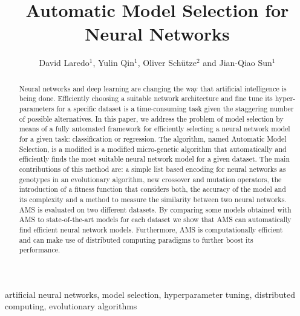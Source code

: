 
\begin{frontmatter}

\title{Automatic Model Selection for Neural Networks}

\author{David Laredo$^{1}$, Yulin Qin$^{1}$, Oliver Sch\"utze$^{2}$ and Jian-Qiao Sun$^{1}$}
\address{
$^{1}$Department of Mechanical Engineering, School of Engineering\\
University of California, Merced, CA 95343, USA\\
$^{2}$Department of Computer Science, CINVESTAV, Mexico City, Mexico\\
Corresponding author: Jian-Qiao Sun. Email: jqsun@ucmerced.edu}

\begin{abstract}
Neural networks and deep learning are changing the way that artificial intelligence is being done. Efficiently choosing a suitable network architecture and fine tune its hyper-parameters for a specific dataset is a time-consuming task given the staggering number of possible alternatives. In this paper, we address the problem of model selection by means of a fully automated framework for efficiently selecting a neural network model for a given task: classification or regression. The algorithm, named Automatic Model Selection, is a modified is a modified micro-genetic algorithm that automatically and efficiently finds the most suitable neural network model for a given dataset. The main contributions of this method are: a simple list based encoding for neural networks as genotypes in an evolutionary algorithm, new crossover and mutation operators, the introduction of a fitness function that considers both, the accuracy of the model and its complexity and a method to measure the similarity between two neural networks. AMS is evaluated on two different datasets. By comparing some models obtained with AMS to state-of-the-art models for each dataset we show that AMS can automatically find efficient neural network models. Furthermore, AMS is computationally efficient and can make use of distributed computing paradigms to further boost its performance. 
\end{abstract}


\begin{keyword}
artificial neural networks\sep
model selection\sep
hyperparameter tuning\sep
distributed computing\sep
evolutionary algorithms
\end{keyword}

\end{frontmatter}

